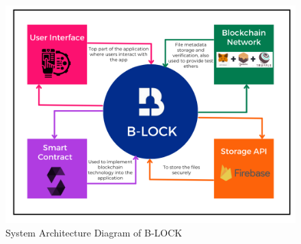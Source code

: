 \documentclass[12pt,a4paper]{report}
\begin{document}
\begin{figure}[hbtp]
\centering
\includegraphics[scale=0.49]{./pic/architecture.png}
\caption{System Architecture Diagram of B-LOCK}
\label{fig:architecture}
\end{figure}
\end{document}
